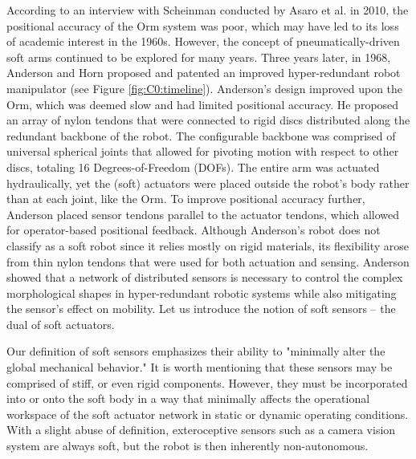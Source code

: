 According to an interview with Scheinman conducted by Asaro et al. \cite{ETHW2020Dec} in 2010, the positional accuracy of the Orm system was poor, which may have led to its loss of academic interest in the 1960s. However, the concept of pneumatically-driven soft arms continued to be explored for many years. Three years later, in 1968, Anderson and Horn proposed and patented an improved hyper-redundant robot manipulator (see Figure \ref{fig:C0:timeline}). Anderson's design improved upon the Orm, which was deemed slow and had limited positional accuracy. He proposed an array of nylon tendons that were connected to rigid discs distributed along the redundant backbone of the robot. The configurable backbone was comprised of universal spherical joints that allowed for pivoting motion with respect to other discs, totaling 16 Degrees-of-Freedom (DOFs). The entire arm was actuated hydraulically, yet the (soft) actuators were placed outside the robot's body rather than at each joint, like the Orm. To improve positional accuracy further, Anderson placed sensor tendons parallel to the actuator tendons, which allowed for operator-based positional feedback. Although Anderson's robot does not classify as a soft robot since it relies mostly on rigid materials, its flexibility arose from thin nylon tendons that were used for both actuation and sensing. Anderson showed that a network of distributed sensors is necessary to control the complex morphological shapes in hyper-redundant robotic systems while also mitigating the sensor's effect on mobility. Let us introduce the notion of soft sensors -- the dual of soft actuators.
%
\vspace{-3mm}

\begin{rmk}
\vspace{-1mm}
Our definition of soft sensors emphasizes their ability to "minimally alter the global mechanical behavior." It is worth mentioning that these sensors may be comprised of stiff, or even rigid components. However, they must be incorporated into or onto the soft body in a way that minimally affects the operational workspace of the soft actuator network in static or dynamic operating conditions. With a slight abuse of definition, exteroceptive sensors such as a camera vision system are always soft, but the robot is then inherently non-autonomous.
\end{rmk}

